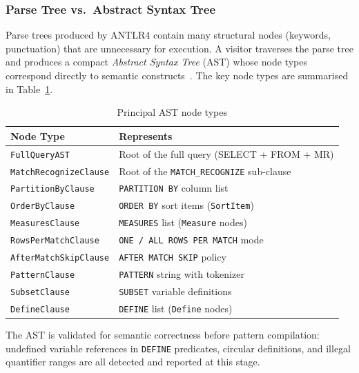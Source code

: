 \subsubsection{Parse Tree vs.\ Abstract Syntax Tree}
\label{subsubsec:meth-ast}

Parse trees produced by ANTLR4 contain many structural nodes
(keywords, punctuation) that are unnecessary for execution.  A
visitor traverses the parse tree and produces a compact
\emph{Abstract Syntax Tree} (AST) whose node types correspond
directly to semantic constructs~\cite{DragonBook,jones2003ast}.  The key node
types are summarised in Table~\ref{tab:meth-ast-nodes}.

\begin{table}[htbp]
  \centering
  \caption{Principal AST node types}
  \label{tab:meth-ast-nodes}
  \begin{tabular}{ll}
    \toprule
    \textbf{Node Type}                  & \textbf{Represents} \\
    \midrule
    \texttt{FullQueryAST}               & Root of the full query (SELECT + FROM + MR) \\
    \texttt{MatchRecognizeClause}        & Root of the \texttt{MATCH\_RECOGNIZE} sub-clause \\
    \texttt{PartitionByClause}           & \texttt{PARTITION BY} column list \\
    \texttt{OrderByClause}              & \texttt{ORDER BY} sort items (\texttt{SortItem}) \\
    \texttt{MeasuresClause}             & \texttt{MEASURES} list (\texttt{Measure} nodes) \\
    \texttt{RowsPerMatchClause}          & \texttt{ONE / ALL ROWS PER MATCH} mode \\
    \texttt{AfterMatchSkipClause}        & \texttt{AFTER MATCH SKIP} policy \\
    \texttt{PatternClause}              & \texttt{PATTERN} string with tokenizer \\
    \texttt{SubsetClause}               & \texttt{SUBSET} variable definitions \\
    \texttt{DefineClause}               & \texttt{DEFINE} list (\texttt{Define} nodes) \\
    \bottomrule
  \end{tabular}
\end{table}

The AST is validated for semantic correctness before pattern
compilation: undefined variable references in \texttt{DEFINE}
predicates, circular definitions, and illegal quantifier ranges are
all detected and reported at this stage.

